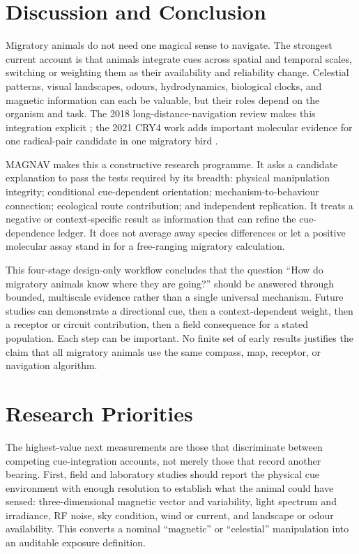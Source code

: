 \documentclass[conference]{IEEEtran}
\begin{document}
\section{Discussion and Conclusion}\label{sec:discussion}
Migratory animals do not need one magical sense to navigate. The strongest current account is that animals integrate cues across spatial and temporal scales, switching or weighting them as their availability and reliability change. Celestial patterns, visual landscapes, odours, hydrodynamics, biological clocks, and magnetic information can each be valuable, but their roles depend on the organism and task. The 2018 long-distance-navigation review makes this integration explicit \cite{mouritsen2018}; the 2021 CRY4 work adds important molecular evidence for one radical-pair candidate in one migratory bird \cite{xu2021}.

MAGNAV makes this a constructive research programme. It asks a candidate explanation to pass the tests required by its breadth: physical manipulation integrity; conditional cue-dependent orientation; mechanism-to-behaviour connection; ecological route contribution; and independent replication. It treats a negative or context-specific result as information that can refine the cue-dependence ledger. It does not average away species differences or let a positive molecular assay stand in for a free-ranging migratory calculation.

This four-stage design-only workflow concludes that the question ``How do migratory animals know where they are going?'' should be answered through bounded, multiscale evidence rather than a single universal mechanism. Future studies can demonstrate a directional cue, then a context-dependent weight, then a receptor or circuit contribution, then a field consequence for a stated population. Each step can be important. No finite set of early results justifies the claim that all migratory animals use the same compass, map, receptor, or navigation algorithm.

\section{Research Priorities}\label{sec:priorities}
The highest-value next measurements are those that discriminate between competing cue-integration accounts, not merely those that record another bearing. First, field and laboratory studies should report the physical cue environment with enough resolution to establish what the animal could have sensed: three-dimensional magnetic vector and variability, light spectrum and irradiance, RF noise, sky condition, wind or current, and landscape or odour availability. This converts a nominal ``magnetic'' or ``celestial'' manipulation into an auditable exposure definition.
\end{document}
